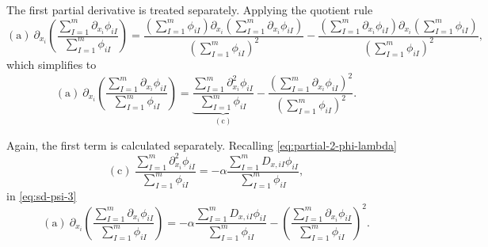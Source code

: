 The first partial derivative is treated separately.
Applying the quotient rule
\begin{equation} \label{eq:sd-psi-2}
    \left( \mathrm{a} \right)\
    \partial_{x_i}
    \left( 
        \frac{
            \sum_{I=1}^{m} \partial_{x_i} \phi_{iI}
        }{
            \sum_{I=1}^{m} \phi_{iI}
        }
    \right)
    =
    \frac{
        \left( 
            \sum_{I=1}^{m} \phi_{iI}
        \right)
        \partial_{x_i}
        \left( 
            \sum_{I=1}^{m} \partial_{x_i} \phi_{iI}
        \right)
    }{
        \left( 
            \sum_{I=1}^{m} \phi_{iI}
        \right)^{2}
    }
    -
    \frac{
        \left( 
            \sum_{I=1}^{m} \partial_{x_i} \phi_{iI}
        \right)
        \partial_{x_i}
        \left( 
            \sum_{I=1}^{m} \phi_{iI}
        \right)
    }{
        \left( 
            \sum_{I=1}^{m} \phi_{iI}
        \right)^{2}
    }
    ,
\end{equation}
which simplifies to
\begin{equation} \label{eq:sd-psi-3}
    \left( \mathrm{a} \right)\
    \partial_{x_i}
    \left( 
        \frac{
            \sum_{I=1}^{m} \partial_{x_i} \phi_{iI}
        }{
            \sum_{I=1}^{m} \phi_{iI}
        }
    \right)
    =
    \underbrace{
        \frac{
            \sum_{I=1}^{m} \partial_{x_i}^{2} \phi_{iI}
        }{
            \sum_{I=1}^{m} \phi_{iI}
        }
    }_{\left( \mathrm{c} \right)}
    -
    \frac{
        \left( 
            \sum_{I=1}^{m} \partial_{x_i} \phi_{iI}
        \right)^{2}
    }{
        \left( 
            \sum_{I=1}^{m} \phi_{iI}
        \right)^{2}
    }
    .
\end{equation}

Again, the first term is calculated separately.
Recalling \cref{eq:partial-2-phi-lambda}
\begin{equation}
    \left( \mathrm{c} \right)\ 
    \frac{
        \sum_{I=1}^{m} \partial_{x_i}^{2} \phi_{iI}
    }{
        \sum_{I=1}^{m} \phi_{iI}
    }
    =
    -\alpha
    \frac{
        \sum_{I=1}^{m}
        D_{x,iI}
        \phi_{iI}
    }{
        \sum_{I=1}^{m} \phi_{iI}
    }
    ,
\end{equation}
in \cref{eq:sd-psi-3}
\begin{equation} \label{eq:derivada-a}
    \left( \mathrm{a} \right)\
    \partial_{x_i}
    \left( 
        \frac{
            \sum_{I=1}^{m} \partial_{x_i} \phi_{iI}
        }{
            \sum_{I=1}^{m} \phi_{iI}
        }
    \right)
    =
    -\alpha
    \frac{
        \sum_{I=1}^{m}
        D_{x,iI}
        \phi_{iI}
    }{
        \sum_{I=1}^{m} \phi_{iI}
    }
    -
    \left( 
        \frac{
            \sum_{I=1}^{m}
            \partial_{x_i}
            \phi_{iI}
        }{
            \sum_{I=1}^{m} \phi_{iI}
        }
    \right)^{2}
    .
\end{equation}

